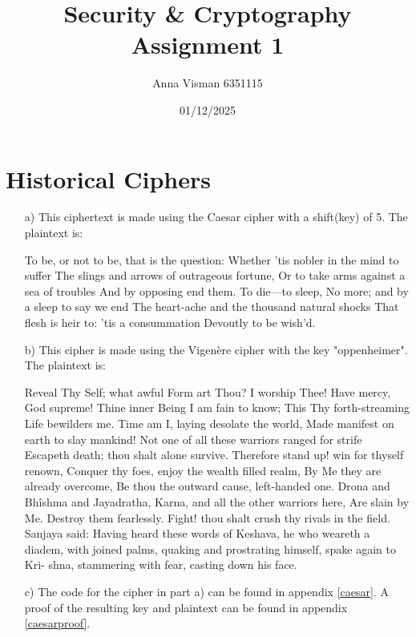 \documentclass[10pt, oneside]{article}
\title{Security \& Cryptography Assignment 1}
\author{Anna Visman 6351115}
\date{01/12/2025}
\begin{document}
\maketitle

\section{Historical Ciphers}

\begin{itemize}
    \item[a)] This ciphertext is made using the Caesar cipher with a shift(key) of 5. The plaintext is: 
    
    To be, or not to be, that is the question: Whether ’tis nobler in the mind to
    suffer The slings and arrows of outrageous fortune, Or to take arms against a
    sea of troubles And by opposing end them. To die—to sleep, No more; and by a sleep
    to say we end The heart-ache and the thousand natural shocks That flesh is
    heir to: ’tis a consummation Devoutly to be wish’d.

    \item[b)] This cipher is made using the Vigenère cipher with the key "oppenheimer". The plaintext is:
    
    Reveal Thy Self; what awful Form art Thou? I worship Thee! Have mercy, God
    supreme! Thine inner Being I am fain to know; This Thy forth-streaming
    Life bewilders me.
    Time am I, laying desolate the world, Made manifest on earth to slay mankind!
    Not one of all these warriors ranged for strife Escapeth death; thou shalt
    alone survive.
    Therefore stand up! win for thyself renown, Conquer thy foes, enjoy the wealth
    filled realm, By Me they are already overcome, Be thou the outward cause,
    left-handed one. Drona and Bhîshma and Jayadratha, Karna, and all the other
    warriors here, Are slain by Me. Destroy them fearlessly. Fight! thou shalt
    crush thy rivals in the field.
    Sanjaya said: Having heard these words of Keshava, he who weareth a diadem,
    with joined palms, quaking and prostrating himself, spake again to Kri-
     shna, stammering with fear, casting down his face.
            
    \item[c)] The code for the cipher in part a) can be found in appendix \ref{caesar}. A proof of the resulting key and plaintext can be found in appendix \ref{caesarproof}.
\end{itemize}
\end{document}
